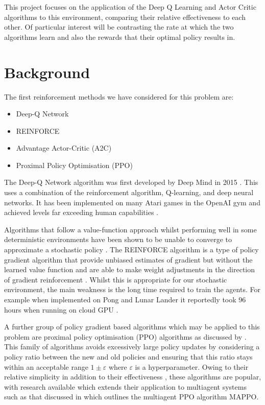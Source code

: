 \documentclass{article}
\begin{document}
This project focuses on the application of the Deep Q Learning and Actor Critic algorithms to this environment, comparing their relative effectiveness to each other.
Of particular interest will be contrasting the rate at which the two algorithms learn and also the rewards that their optimal policy results in.

\section{Background} \label{Background}

The first reinforcement methods we have considered for this problem are:

\begin{itemize}
    \item Deep-Q Network
    \item REINFORCE
    \item Advantage Actor-Critic (A2C)
    \item Proximal Policy Optimisation (PPO)
\end{itemize}

The Deep-Q Network algorithm was first developed by Deep Mind in 2015 \citet{Mnih2015}.
This uses a combination of the reinforcement algorithm, Q-learning, and deep neural networks.
It has been implemented on many Atari games in the OpenAI gym and achieved levels far exceeding human capabilities \citet{Mnih2015}.

Algorithms that follow a value-function approach whilst performing well in some deterministic environments have been shown to be unable to converge to approximate a stochastic policy \citet{AdvanacesinNIPS}.
The REINFORCE algorithm is a type of policy gradient algorithm that provide unbiased estimates of gradient but without the learned value function and are able to make weight adjustments in the direction of gradient reinforcement \citet{Williams1992}.
Whilst this is appropriate for our stochastic environment, the main weakness is the long time required to train the agents. For example when implemented on Pong and Lunar Lander it reportedly took 96 hours when running on cloud GPU \citet{REINFORCE}.

A further group of policy gradient based algorithms which may be applied to this problem are proximal policy optimisation (PPO) algorithms as discussed by \citet{PPOAlgo}.
This family of algorithms avoids excessively large policy updates by considering a policy ratio between the new and old policies and ensuring that this ratio stays within an acceptable range $1\pm\varepsilon$ where $\varepsilon$ is a hyperparameter.
Owing to their relative simplicity in addition to their effectiveness \citet{PPOmultiagentgames}, these algorithms are popular, with research available which extends their application to multiagent systems such as that discussed in \citet{PPOAlgo} which outlines the multiagent PPO algorithm MAPPO.
\end{document}
